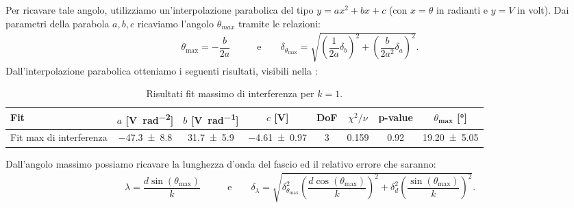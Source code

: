 \documentclass[a4paper]{article}
\begin{document}
Per ricavare tale angolo, utilizziamo un'interpolazione parabolica del tipo $y=ax^2+bx+c$ (con $x=\theta$ in radianti e $y=V$ in volt). Dai parametri della parabola $a,b,c$ ricaviamo l'angolo $\theta_{max}$ tramite le relazioni:
\begin{align}
  \theta_{\text{max}} = -\dfrac{b}{2a} \qquad & \text{e}\qquad
  \delta_{\theta_{\text{max}}} = \sqrt{\left(\dfrac{1}{2a}\delta_b\right)^2 + \left(\dfrac{b}{2a^2}\delta_a\right)^2}. \label{eq:angolo_max_doppia_fenditura}
\end{align}
Dall'interpolazione parabolica otteniamo i seguenti risultati, visibili nella :
\begin{table}[htbp]
\centering
\caption{Risultati fit massimo di interferenza per $k=1$.}
\label{tab:fit_doppia_fenditura}
\begin{tabular}{|l|ccccccc|}
\hline
Fit & $a$ [\si{\volt\per\radian\squared}]& $b$ [\si{\volt\per\radian}]& $c$ [\si{\volt}]& DoF & $\chi^2/\nu$ & p-value & $\theta_{\textbf{max}}$ [\si{\degree}] \\\hline\hline
Fit max di interferenza & \num{-47.3 \pm 8.8} & \num{31.7 \pm 5.9} & \num{-4.61 \pm 0.97} & 3 & 0.159 & 0.92 & \num{19.20 \pm 5.05}\\\hline
\end{tabular}
\end{table}
Dall'angolo massimo possiamo ricavare la lunghezza d'onda del fascio ed il relativo errore che saranno:
\begin{align}
  \lambda = \dfrac{d \sin(\theta_{\text{max}})}{k} \qquad & \text{e} \qquad \delta_{\lambda} = \sqrt{ \delta_{\theta_{\text{max}}}^2 \left( \dfrac{d \cos(\theta_{\text{max}})}{k} \right)^2 + \delta_d^2 \left( \dfrac{\sin(\theta_{\text{max}})}{k} \right)^2 }. \label{eq:lambda_delta_combined_doppia_fenditura}
\end{align}
\end{document}
